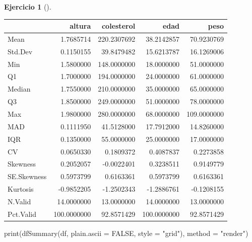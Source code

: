 \documentclass[
  a4paper,
]{scrreport}
\newenvironment{Shaded}{\begin{snugshade}}{\end{snugshade}}
\newcommand{\AttributeTok}[1]{\textcolor[rgb]{0.40,0.45,0.13}{#1}}
\newcommand{\ConstantTok}[1]{\textcolor[rgb]{0.56,0.35,0.01}{#1}}
\newcommand{\FunctionTok}[1]{\textcolor[rgb]{0.28,0.35,0.67}{#1}}
\newcommand{\NormalTok}[1]{\textcolor[rgb]{0.00,0.23,0.31}{#1}}
\newcommand{\StringTok}[1]{\textcolor[rgb]{0.13,0.47,0.30}{#1}}
\theoremstyle{definition}
\newtheorem{exercise}{Ejercicio}[chapter]
\theoremstyle{remark}
\begin{document}
\begin{exercise}[]
\begin{enumerate}
\begin{tcolorbox}
  \begin{longtable*}[t]{lrrrr}
  \toprule
   & altura & colesterol & edad & peso\\
  \midrule
  Mean & 1.7685714 & 220.2307692 & 38.2142857 & 70.9230769\\
  Std.Dev & 0.1150155 & 39.8479482 & 15.6213787 & 16.1269006\\
  Min & 1.5800000 & 148.0000000 & 18.0000000 & 51.0000000\\
  Q1 & 1.7000000 & 194.0000000 & 24.0000000 & 61.0000000\\
  Median & 1.7550000 & 210.0000000 & 35.0000000 & 65.0000000\\
  \addlinespace
  Q3 & 1.8500000 & 249.0000000 & 51.0000000 & 78.0000000\\
  Max & 1.9800000 & 280.0000000 & 68.0000000 & 109.0000000\\
  MAD & 0.1111950 & 41.5128000 & 17.7912000 & 14.8260000\\
  IQR & 0.1350000 & 55.0000000 & 25.0000000 & 17.0000000\\
  CV & 0.0650330 & 0.1809372 & 0.4087837 & 0.2273858\\
  \addlinespace
  Skewness & 0.2052057 & -0.0022401 & 0.3238511 & 0.9149779\\
  SE.Skewness & 0.5973799 & 0.6163361 & 0.5973799 & 0.6163361\\
  Kurtosis & -0.9852205 & -1.2502343 & -1.2886761 & -0.1208155\\
  N.Valid & 14.0000000 & 13.0000000 & 14.0000000 & 13.0000000\\
  Pct.Valid & 100.0000000 & 92.8571429 & 100.0000000 & 92.8571429\\
  \bottomrule
  \end{longtable*}

\begin{Shaded}
\begin{Highlighting}[]
\FunctionTok{print}\NormalTok{(}\FunctionTok{dfSummary}\NormalTok{(df, }\AttributeTok{plain.ascii =} \ConstantTok{FALSE}\NormalTok{, }\AttributeTok{style =} \StringTok{"grid"}\NormalTok{), }\AttributeTok{method =} \StringTok{"render"}\NormalTok{)}
\end{Highlighting}
\end{Shaded}


\end{tcolorbox}
\end{enumerate}
\end{exercise}
\end{document}
